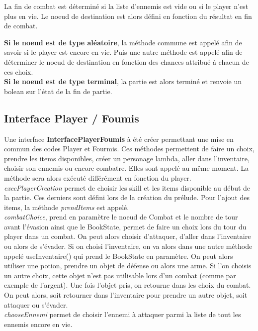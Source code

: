 		La fin de combat est déterminé si la liste d'ennemis est vide ou si le player n'est plus en vie. Le noeud de destination est alors défini en fonction du résultat en fin de combat.

		\textbf{Si le noeud est de type aléatoire}, la méthode commune est appelé afin de savoir si le player est encore en vie. Puis une autre méthode est appelé afin de déterminer le noeud de destination en fonction des chances attribué à chacun de ces choix.\\

		\textbf{Si le noeud est de type terminal}, la partie est alors terminé et renvoie un bolean sur l'état de la fin de partie.\\

	\subsection{Interface Player / Foumis}
		Une interface \textbf{InterfacePlayerFoumis} à été créer permettant une mise en commun des codes Player et Fourmis. Ces méthodes permettent de faire un choix, prendre les items disponibles, créer un personage lambda, aller dans l'inventaire, choisir son ennemis ou encore combatre. Elles sont appelé au même moment. La méthode sera alors exécuté différément en fonction du player.\\

		\textit{execPlayerCreation} permet de choisir les skill et les items disponible au début de la partie. Ces derniers sont défini lors de la création du prélude. Pour l'ajout des items, la méthode \textit{prendItems} est appelé.\\

		\textit{combatChoice}, prend en paramètre le noeud de Combat et le nombre de tour avant l'évasion ainsi que le BookState, permet de faire un choix lors du tour du player dans un combat. On peut alors choisir d'attaquer, d'aller dans l'inventaire ou alors de s'évader. Si on choisi l'inventaire, on va alors dans une autre méthode appelé useInventaire() qui prend le BookState en paramètre. On peut alors utiliser une potion, prendre un objet de défense ou alors une arme. Si l'on choisis un autre choix, cette objet n'est pas utilisable lors d'un combat (comme par exemple de l'argent). Une fois l'objet pris, on retourne dans les choix du combat. On peut alors, soit retourner dans l'inventaire pour prendre un autre objet, soit attaquer ou s'évader.\\

		\textit{chooseEnnemi} permet de choisir l'ennemi à attaquer parmi la liste de tout les ennemis encore en vie.\\

